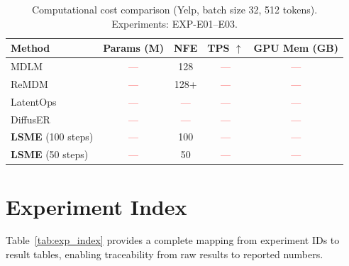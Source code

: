 \documentclass{article}
\newcommand{\tbd}[1]{\textcolor{red}{#1}}  %
\begin{document}
\begin{table}[h]
\centering
\caption{Computational cost comparison (Yelp, batch size 32, 512 tokens). Experiments: EXP-E01--E03.}
\label{tab:efficiency}
\begin{tabular}{lcccc}
\toprule
\textbf{Method} & \textbf{Params (M)} & \textbf{NFE} & \textbf{TPS $\uparrow$} & \textbf{GPU Mem (GB)} \\
\midrule
MDLM & \tbd{---} & 128 & \tbd{---} & \tbd{---} \\
ReMDM & \tbd{---} & 128+ & \tbd{---} & \tbd{---} \\
LatentOps & \tbd{---} & \tbd{---} & \tbd{---} & \tbd{---} \\
DiffusER & \tbd{---} & \tbd{---} & \tbd{---} & \tbd{---} \\
\midrule
\textbf{LSME} (100 steps) & \tbd{---} & 100 & \tbd{---} & \tbd{---} \\
\textbf{LSME} (50 steps) & \tbd{---} & 50 & \tbd{---} & \tbd{---} \\
\bottomrule
\end{tabular}
\end{table}

\section{Experiment Index}
\label{sec:index}

Table~\ref{tab:exp_index} provides a complete mapping from experiment IDs to result tables, enabling traceability from raw results to reported numbers.
\end{document}
